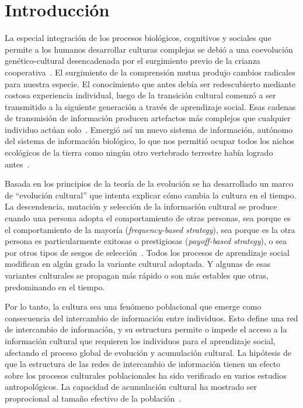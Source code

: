 \documentclass[a4paper,11pt]{book}
\theoremstyle{definition}
\begin{document}
\section{Introducción}
La especial integración de los procesos biológicos, cognitivos y sociales que permite a los humanos desarrollar culturas complejas se debió a una coevolución genético-cultural desencadenada por el surgimiento previo de la crianza cooperativa~\cite{hrdy2020-emotionallyModern, Koster2020}.
%
El surgimiento de la comprensión mutua produjo cambios radicales para nuestra especie.
%
El conocimiento que antes debía ser redescubierto mediante costosa experiencia individual, luego de la transición cultural comenzó a ser transmitido a la siguiente generación a través de aprendizaje social.
%
Esas cadenas de transmisión de información producen artefactos más complejos que cualquier individuo actúan solo~\cite{Derex2015}.
%
Emergió así un nuevo sistema de información, autónomo del sistema de información biológico, lo que nos permitió ocupar todos los nichos ecológicos de la tierra como ningún otro vertebrado terrestre había logrado antes~\cite{Boyd2011}.

Basada en los principios de la teoría de la evolución se ha desarrollado un marco de ``evolución cultural'' que intenta explicar cómo cambia la cultura en el tiempo.
%
La descendencia, mutación y selección de la información cultural se produce cuando una persona adopta el comportamiento de otras personas, sea porque es el comportamiento de la mayoría (\emph{frequency-based strategy}), sea porque es la otra persona es particularmente exitosas o prestigiosas (\emph{payoff-based strategy}), o sea por otros tipos de sesgos de selección~\cite{muthukrishna2016-whenAndWhoSocialLearning, rendell2011-cognitiveCulture}.
%
Todos los procesos de aprendizaje social modifican en algún grado la variante cultural adoptada.
%
Y algunas de esas variantes culturales se propagan más rápido o son más estables que otras, predominando en el tiempo.

Por lo tanto, la cultura sea una fenómeno poblacional que emerge como consecuencia del intercambio de información entre individuos.
%
Esto define una red de intercambio de información, y su estructura permite o impede el acceso a la información cultural que requieren los individuos para el aprendizaje social, afectando el proceso global de evolución y acumulación cultural.
%
La hipótesis de que la estructura de las redes de intercambio de información tienen un efecto sobre los procesos culturales poblacionales ha sido verificado en varios estudios antropológicos.
%
La capacidad de acumulación cultural ha mostrado ser proprocional al tamaño efectivo de la población~\cite{kempe2014-experiment, kline2010-populationSize, Henrich2004, shennan2001-demographyAndCulture}.
\end{document}
